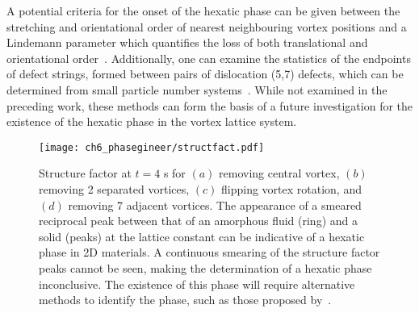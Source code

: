 A potential criteria for the onset of the hexatic phase can be given between the stretching and orientational order of nearest neighbouring vortex positions and a Lindemann parameter which quantifies the loss of both translational and orientational order~\cite{CM:Bruun_prb_2014}. Additionally, one can examine the statistics of the endpoints of defect strings, formed between pairs of dislocation (5,7) defects, which can be determined from small particle number systems~\cite{CM:Lechner_prl_2014}. While not examined in the preceding work, these methods can form the basis of a future investigation for the existence of the hexatic phase in the vortex lattice system.

\begin{figure}\centering
    \texttt{[image: ch6\_phasegineer/structfact.pdf]}
    \caption{Structure factor at $t=4$ s for $(a)$ removing central vortex, $(b)$ removing 2 separated vortices, $(c)$ flipping vortex rotation, and $(d)$ removing 7 adjacent vortices. The appearance of a smeared reciprocal peak between that of an amorphous fluid (ring) and a solid (peaks) at the lattice constant can be indicative of a hexatic phase in 2D materials. A continuous smearing of the structure factor peaks cannot be seen, making the determination of a hexatic phase inconclusive. The existence of this phase will require alternative methods to identify the phase, such as those proposed by~\cite{CM:Bruun_prb_2014,CM:Lechner_prl_2014}.}\label{fig:struct_fact}
\end{figure}

